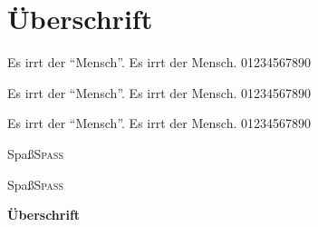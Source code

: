 \documentclass[a4paper,10pt, ngerman]{scrartcl}
\begin{document}
\section{Überschrift}

Es irrt der "`Mensch"'. Es irrt der Mensch. 01234567890

{\sffamily
Es irrt der "`Mensch"'. Es irrt der Mensch. 01234567890}

Es irrt der "`Mensch"'. Es irrt der Mensch. 01234567890

\bigskip
Spaß\quad\textsc{Spaß}

\bigskip
{\sffamily Spaß\quad\textsc{Spaß}}

\bigskip
\textbf{\rmfamily\Large Überschrift}
\end{document}

